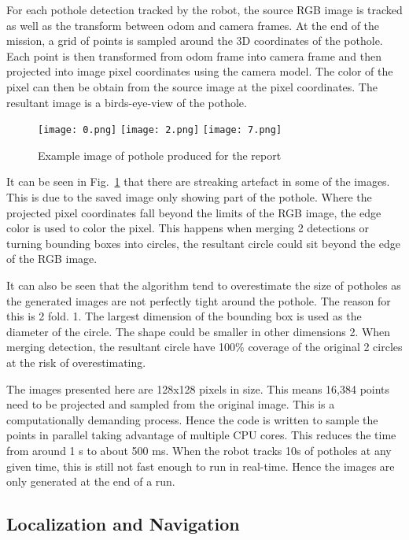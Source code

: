 \documentclass[conference]{IEEEtran}
\begin{document}
For each pothole detection tracked by the robot, the source RGB image is tracked as well as the transform between odom and camera frames. At the end of the mission, a grid of points is sampled around the 3D coordinates of the pothole. Each point is then transformed from odom frame into camera frame and then projected into image pixel coordinates using the camera model. The color of the pixel can then be obtain from the source image at the pixel coordinates. The resultant image is a birds-eye-view of the pothole.

\begin{figure}[h]
    \centering
    \texttt{[image: 0.png]}
    \texttt{[image: 2.png]}
    \texttt{[image: 7.png]}
    \caption{Example image of pothole produced for the report}
    \label{fig:pothole_image}
\end{figure}

It can be seen in Fig.~\ref{fig:pothole_image} that there are streaking artefact in some of the images. This is due to the saved image only showing part of the pothole. Where the projected pixel coordinates fall beyond the limits of the RGB image, the edge color is used to color the pixel. This happens when merging 2 detections or turning bounding boxes into circles, the resultant circle could sit beyond the edge of the RGB image.

It can also be seen that the algorithm tend to overestimate the size of potholes as the generated images are not perfectly tight around the pothole. The reason for this is 2 fold. 1. The largest dimension of the bounding box is used as the diameter of the circle. The shape could be smaller in other dimensions 2. When merging detection, the resultant circle have 100\% coverage of the original 2 circles at the risk of overestimating.

The images presented here are 128x128 pixels in size. This means 16,384 points need to be projected and sampled from the original image. This is a computationally demanding process. Hence the code is written to sample the points in parallel taking advantage of multiple CPU cores. This reduces the time from around 1 s to about 500 ms. When the robot tracks 10s of potholes at any given time, this is still not fast enough to run in real-time. Hence the images are only generated at the end of a run.

\subsection{Localization and Navigation}
\end{document}
